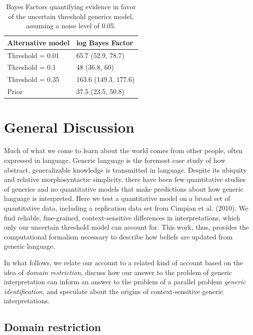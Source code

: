 \documentclass[floatsintext,man]{apa6}
\theoremstyle{definition}
\theoremstyle{definition}
\theoremstyle{definition}
\theoremstyle{remark}
\begin{document}
\begin{table}[H]
\centering
\begingroup\fontsize{9pt}{10pt}\selectfont
\begin{tabular}{ll}
  \hline
Alternative model & log Bayes Factor \\ 
  \hline
Threshold = 0.01 & 65.7 (52.9, 78.7) \\ 
  Threshold = 0.1 & 48 (36.8, 60) \\ 
  Threshold = 0.35 & 163.6 (149.3, 177.6) \\ 
  Prior & 37.5 (23.5, 50.8) \\ 
   \hline
\end{tabular}
\endgroup
\caption{Bayes Factors quantifying evidence in favor of the uncertain threshold generics model, assuming a noise level of 0.05.} 
\end{table}

\section{General Discussion}\label{general-discussion}

Much of what we come to learn about the world comes from other people,
often expressed in language. Generic language is the foremost case study
of how abstract, generalizable knowledge is transmitted in language.
Despite its ubiquity and relative morphosyntactic simplicity, there have
been few quantitative studies of generics and no quantitative models
that make predictions about how generic language is interpreted. Here we
test a quantitative model on a broad set of quantitative data, including
a replication data set from Cimpian et al. (2010). We find reliable,
fine-grained, context-sensitive differences in interpretations, which
only our uncertain threshold model can account for. This work, thus,
provides the computational formalism necessary to describe how beliefs
are updated from generic language.

In what follows, we relate our account to a related kind of account
based on the idea of \emph{domain restriction}, discuss how our answer
to the problem of generic interpretation can inform an answer to the
problem of a parallel problem \emph{generic identification}, and
speculate about the origins of context-sensitive generic
interpretations.

\subsection{Domain restriction}\label{domain-restriction}
\end{document}
